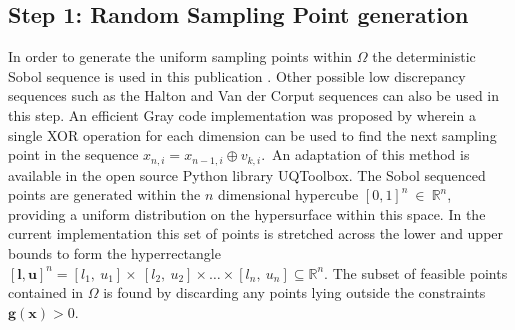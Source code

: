 \subsection{Step 1: Random Sampling Point generation} \label{sec:tgo1}
In order to generate the uniform sampling points within $\Omega$ the deterministic Sobol sequence is  used in this publication \cite{Henderson2015, Sobol1967}. Other possible low discrepancy sequences such as the Halton and Van der Corput sequences \cite{zbMATH03440485} can also be used in this step. An efficient Gray code implementation was proposed by \citet{Antonov1979} wherein a single XOR operation for each dimension can be used to find the next sampling point in the sequence $x_{n,i}=x_{n-1,i} \oplus v_{k,i}. \,$ An adaptation of this method is available in the open source Python library UQToolbox\cite{Bigoni2016}. The Sobol sequenced points are generated within the $n$ dimensional hypercube $ [0, 1]^n~\in ~\mathbb{R}^n $, providing a uniform distribution on the hypersurface within this space. In the current implementation this set of points is stretched across the lower and upper bounds to form the hyperrectangle $[\mathbf{l}, \mathbf{u}]^n = [l_1,~u_1] \times~[l_2,~u_2]  \times \dots \times [l_n,~u_n] \subseteq  \mathbb{R}^n$. The subset of feasible points contained in $\Omega$ is found by discarding any points lying outside the constraints $ \mathbf{g}(\mathbf{x}) > 0$.

